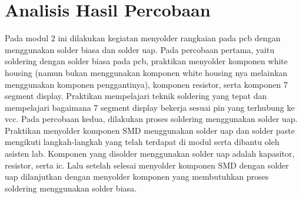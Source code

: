 \section*{Analisis Hasil Percobaan}
\indent
Pada modul 2 ini dilakukan kegiatan menyolder rangkaian pada pcb dengan menggunakan solder biasa dan solder uap. Pada percobaan pertama, yaitu soldering dengan solder biasa pada pcb, praktikan menyolder komponen white housing (namun bukan menggunakan komponen white housing nya melainkan menggunakan komponen penggantinya), komponen resistor, serta komponen 7 segment display. Praktikan mempelajari teknik soldering yang tepat dan mempelajari bagaimana 7 segment display bekerja sesuai pin yang terhubung ke vcc. 
Pada percobaan kedua, dilakukan proses soldering menggunakan solder uap. Praktikan menyolder komponen SMD menggunakan solder uap dan solder paste mengikuti langkah-langkah yang telah terdapat di modul serta dibantu oleh asisten lab. Komponen yang disolder menggunakan solder uap adalah kapasitor, resistor, serta ic. Lalu setelah selesai menyolder komponen SMD dengan solder uap dilanjutkan dengan menyolder komponen yang membutuhkan proses soldering menggunakan solder biasa. 




